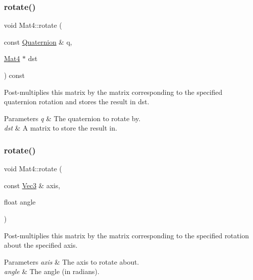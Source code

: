 \subsubsection{\texorpdfstring{rotate()}{rotate()}\hspace{0.1cm}{\footnotesize\ttfamily [4/8]}}
{\footnotesize\ttfamily void Mat4\+::rotate (\begin{DoxyParamCaption}\item[{const \hyperlink{classQuaternion}{Quaternion} \&}]{q,  }\item[{\hyperlink{classMat4}{Mat4} $\ast$}]{dst }\end{DoxyParamCaption}) const}

Post-\/multiplies this matrix by the matrix corresponding to the specified quaternion rotation and stores the result in dst.


\begin{DoxyParams}{Parameters}
{\em q} & The quaternion to rotate by. \\
\hline
{\em dst} & A matrix to store the result in. \\
\hline
\end{DoxyParams}
\mbox{\label{classMat4_a6bb112d2f8aebd87cddc46fedcd855e1}} 
\subsubsection{\texorpdfstring{rotate()}{rotate()}\hspace{0.1cm}{\footnotesize\ttfamily [5/8]}}
{\footnotesize\ttfamily void Mat4\+::rotate (\begin{DoxyParamCaption}\item[{const \hyperlink{classVec3}{Vec3} \&}]{axis,  }\item[{float}]{angle }\end{DoxyParamCaption})}

Post-\/multiplies this matrix by the matrix corresponding to the specified rotation about the specified axis.


\begin{DoxyParams}{Parameters}
{\em axis} & The axis to rotate about. \\
\hline
{\em angle} & The angle (in radians). \\
\hline
\end{DoxyParams}
\mbox{\label{classMat4_a6bb112d2f8aebd87cddc46fedcd855e1}} 
